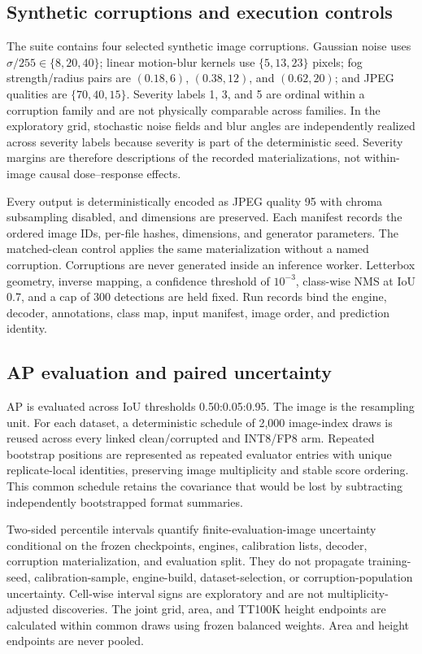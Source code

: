 \subsection{Synthetic corruptions and execution controls}
\label{sec:corruptions}

The suite contains four selected synthetic image corruptions. Gaussian noise
uses $\sigma/255\in\{8,20,40\}$; linear motion-blur kernels use
$\{5,13,23\}$ pixels; fog strength/radius pairs are $(0.18,6)$, $(0.38,12)$,
and $(0.62,20)$; and JPEG qualities are $\{70,40,15\}$. Severity labels 1, 3,
and 5 are ordinal within a corruption family and are not physically comparable
across families. In the exploratory grid, stochastic noise fields and blur
angles are independently realized across severity labels because severity is
part of the deterministic seed. Severity margins are therefore descriptions of
the recorded materializations, not within-image causal dose--response effects.

Every output is deterministically encoded as JPEG quality 95 with chroma
subsampling disabled, and dimensions are preserved. Each manifest records the
ordered image IDs, per-file hashes, dimensions, and generator parameters. The
matched-clean control applies the same materialization without a named
corruption. Corruptions are never generated inside an inference worker.
Letterbox geometry, inverse mapping, a confidence threshold of $10^{-3}$,
class-wise NMS at IoU 0.7, and a cap of 300 detections are held fixed. Run
records bind the engine, decoder, annotations, class map, input manifest, image
order, and prediction identity.

\subsection{AP evaluation and paired uncertainty}
\label{sec:uncertainty}

AP is evaluated across IoU thresholds 0.50:0.05:0.95. The image is the
resampling unit. For each dataset, a deterministic schedule of 2,000 image-index
draws is reused across every linked clean/corrupted and INT8/FP8 arm. Repeated
bootstrap positions are represented as repeated evaluator entries with unique
replicate-local identities, preserving image multiplicity and stable score
ordering. This common schedule retains the covariance that would be lost by
subtracting independently bootstrapped format summaries.

Two-sided percentile intervals quantify finite-evaluation-image uncertainty
conditional on the frozen checkpoints, engines, calibration lists, decoder,
corruption materialization, and evaluation split. They do not propagate
training-seed, calibration-sample, engine-build, dataset-selection, or
corruption-population uncertainty. Cell-wise interval signs are exploratory and
are not multiplicity-adjusted discoveries. The joint grid, area, and TT100K
height endpoints are calculated within common draws using frozen balanced
weights. Area and height endpoints are never pooled.

